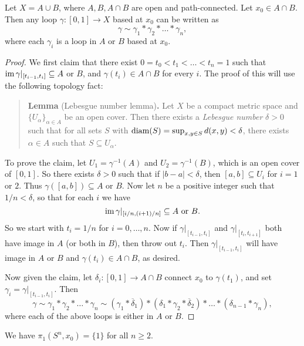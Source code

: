 \begin{lemma}\label{lem:break-paths}
  Let $X = A \cup B$, where $A, B, A \cap B$
  are open and path-connected. Let $x_0 \in A \cap B$.
  Then any loop $\gamma : [0, 1] \to X$ based at
  $x_0$ can be written as
  \[
    \gamma \sim \gamma_1 * \gamma_2 * \dots * \gamma_n,
  \]
  where each $\gamma_i$ is a loop in $A$ or $B$
  based at $x_0$.
\end{lemma}

\begin{proof}
  We first claim that there exist
  $0 = t_0 < t_1 < \dots < t_n = 1$ such that
  $\operatorname{im} \gamma|_{[t_{i - 1}, t_i]} \subseteq A$
  or $B$, and $\gamma(t_i) \in A \cap B$ for every $i$.
  The proof of this will use the following
  topology fact:
  \begin{quote}
    \textbf{Lemma} (Lebesgue number lemma)\textbf{.}
    Let $X$ be a compact
    metric space and $\{U_\alpha\}_{\alpha \in A}$ be
    an open cover. Then there exists a \emph{Lebesgue number}
    $\delta > 0$ such that for all sets $S$ with
    $\operatorname{diam}(S) = \sup_{x, y \in S} d(x, y) < \delta$,
    there exists $\alpha \in A$ such that $S \subseteq U_\alpha$.
  \end{quote}
  To prove the claim, let $U_1 = \gamma^{-1}(A)$
  and $U_2 = \gamma^{-1}(B)$, which is an open
  cover of $[0, 1]$. So there exists $\delta > 0$
  such that if $|b - a| < \delta$, then
  $[a, b] \subseteq U_i$ for $i = 1$ or $2$. Thus
  $\gamma([a, b]) \subseteq A$ or $B$. Now let
  $n$ be a positive integer such that $1 / n < \delta$,
  so that for each $i$ we have
  \[\operatorname{im} \gamma|_{[i / n, (i + 1) / n]} \subseteq A \text{ or } B.\]
  So we start with $t_i = 1 / n$ for $i = 0, \dots, n$.
  Now if $\gamma|_{[t_{i - 1}, t_i]}$ and
  $\gamma|_{[t_i, t_{i + 1}]}$ both have image in
  $A$ (or both in $B$), then throw out $t_i$. Then
  $\gamma|_{[t_{i - 1}, t_{i}]}$ will have image in
  $A$ or $B$ and $\gamma(t_{i}) \in A \cap B$,
  as desired.

  Now given the claim, let
  $\delta_i : [0, 1] \to A \cap B$ connect
  $x_0$ to $\gamma(t_1)$, and set
  $\gamma_i = \gamma|_{[t_{i - 1}, t_i]}$. Then
  \[
    \gamma \sim \gamma_1 * \gamma_2 * \dots * \gamma_n
    \sim (\gamma_1 * \overline{\delta}_1)
    * (\delta_1 * \gamma_2 * \overline{\delta}_2)
    * \dots
    * (\delta_{n - 1} * \gamma_n),
  \]
  where each of the above loops is either in
  $A$ or $B$.
\end{proof}

\begin{theorem}
  We have $\pi_1(S^n, x_0) = \{1\}$ for all $n \ge 2$.
\end{theorem}

